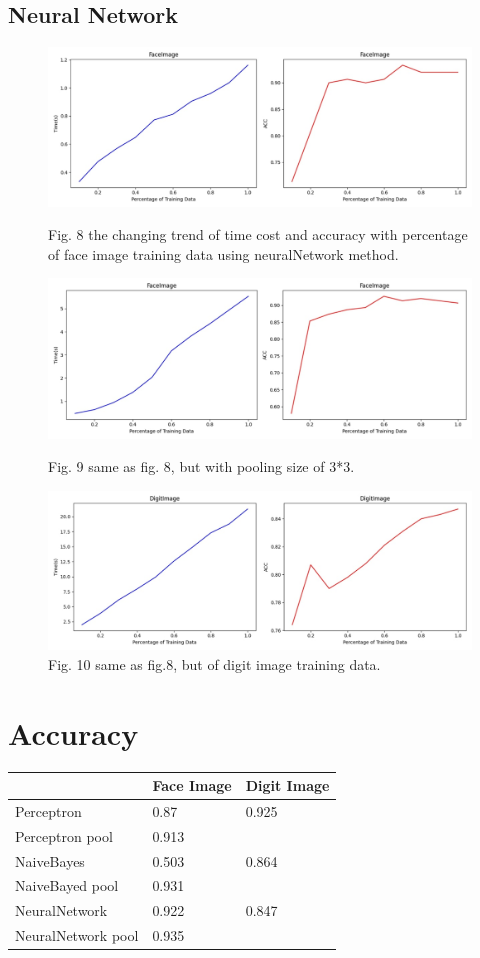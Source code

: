 \documentclass{article}
\begin{document}
\subsection{Neural Network}
\begin{figure}[h]
  	\center
  	\includegraphics*[scale=0.27]{fig8.jpg}
	\caption{Fig. 8 the changing trend of time cost and accuracy with percentage of face image training data using neuralNetwork method.}
	\includegraphics*[scale=0.27]{fig9.jpg}
	\caption{Fig. 9 same as fig. 8, but with pooling size of 3*3.}
	\includegraphics*[scale=0.27]{fig10.jpg}
	\caption{Fig. 10 same as fig.8, but of digit image training data.}
	\label{fig:example}
  \end{figure}

\clearpage
\section{Accuracy}
\begin{center}
    \begin{tabular}{| p{4cm} | p{3cm} | p{3cm} |  }
    \hline
    
    & Face Image & Digit Image\\ \hline
    Perceptron& 0.87& 0.925\\ \hline
    Perceptron pool& 0.913& \\ \hline
    NaiveBayes & 0.503& 0.864 \\ \hline
    NaiveBayed pool & 0.931 &  \\ \hline
    NeuralNetwork & 0.922& 0.847\\ \hline
    NeuralNetwork pool & 0.935& \\ \hline
    \end{tabular}
\end{center}
\end{document}
